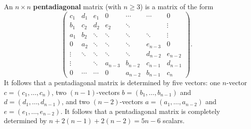 \documentclass[12pt]{article}
\begin{document}
An $n \times n$ {\bf pentadiagonal} matrix (with $n\ge 3$) is 
a matrix of the form
\[
\begin{pmatrix}
c_1    &   d_1  &   e_1     &   0       &  \cdots  & \cdots  &  0       \\ 
b_1    &   c_2  &   d_2     &   e_2     &  \ddots  &         &  \vdots  \\
a_1    &   b_2  &   \ddots  &   \ddots  &  \ddots  & \ddots  &  \vdots  \\
  0    &   a_2  &  \ddots   &  \ddots   & \ddots   & e_{n-3} &  0       \\ 
\vdots & \ddots &   \ddots   &   \ddots  &  \ddots  & d_{n-2} &  e_{n-2} \\
\vdots &        &   \ddots  &   a_{n-3} &  b_{n-2} & c_{n-1} &  d_{n-1} \\
0      & \cdots &   \cdots  &   0       &  a_{n-2} & b_{n-1} &  c_n
\end{pmatrix}.
\]
It follows that a pentadiagonal matrix is determined by five vectors:
one $n$-vector $c=(c_1,\ldots, c_n)$, 
two $(n-1)$-vectors $b=(b_1,\ldots, b_{n-1})$ 
               and  $d=(d_1,\ldots, d_{n-1})$,
and two $(n-2)$-vectors $a=(a_1,\ldots, a_{n-2})$ 
               and  $e=(e_1,\ldots, e_{n-2})$.
It follows that a pentadiagonal matrix is completely determined
by $n+2(n-1)+2(n-2)=5n-6$ scalars.
\end{document}
